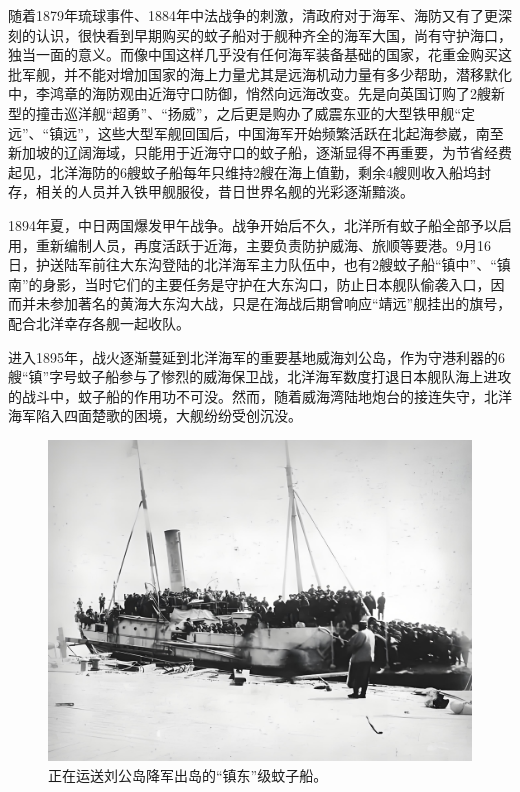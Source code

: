 \documentclass[12pt,UTF8]{ctexbook}
\begin{document}
随着1879年琉球事件、1884年中法战争的刺激，清政府对于海军、海防又有了更深刻的认识，很快看到早期购买的蚊子船对于舰种齐全的海军大国，尚有守护海口，独当一面的意义。而像中国这样几乎没有任何海军装备基础的国家，花重金购买这批军舰，并不能对增加国家的海上力量尤其是远海机动力量有多少帮助，潜移默化中，李鸿章的海防观由近海守口防御，悄然向远海改变。先是向英国订购了2艘新型的撞击巡洋舰“超勇”、“扬威”，之后更是购办了威震东亚的大型铁甲舰“定远”、“镇远”，这些大型军舰回国后，中国海军开始频繁活跃在北起海参崴，南至新加坡的辽阔海域，只能用于近海守口的蚊子船，逐渐显得不再重要，为节省经费起见，北洋海防的6艘蚊子船每年只维持2艘在海上值勤，剩余4艘则收入船坞封存，相关的人员并入铁甲舰服役，昔日世界名舰的光彩逐渐黯淡。

1894年夏，中日两国爆发甲午战争。战争开始后不久，北洋所有蚊子船全部予以启用，重新编制人员，再度活跃于近海，主要负责防护威海、旅顺等要港。9月16日，护送陆军前往大东沟登陆的北洋海军主力队伍中，也有2艘蚊子船“镇中”、“镇南”的身影，当时它们的主要任务是守护在大东沟口，防止日本舰队偷袭入口，因而并未参加著名的黄海大东沟大战，只是在海战后期曾响应“靖远”舰挂出的旗号，配合北洋幸存各舰一起收队。

进入1895年，战火逐渐蔓延到北洋海军的重要基地威海刘公岛，作为守港利器的6艘“镇”字号蚊子船参与了惨烈的威海保卫战，北洋海军数度打退日本舰队海上进攻的战斗中，蚊子船的作用功不可没。然而，随着威海湾陆地炮台的接连失守，北洋海军陷入四面楚歌的困境，大舰纷纷受创沉没。

\begin{figure}[htbp]
	\centering
	\includegraphics[width=1\linewidth]{Images/17}
	\caption{正在运送刘公岛降军出岛的“镇东”级蚊子船。}
	\label{fig:1}
\end{figure}
\end{document}

